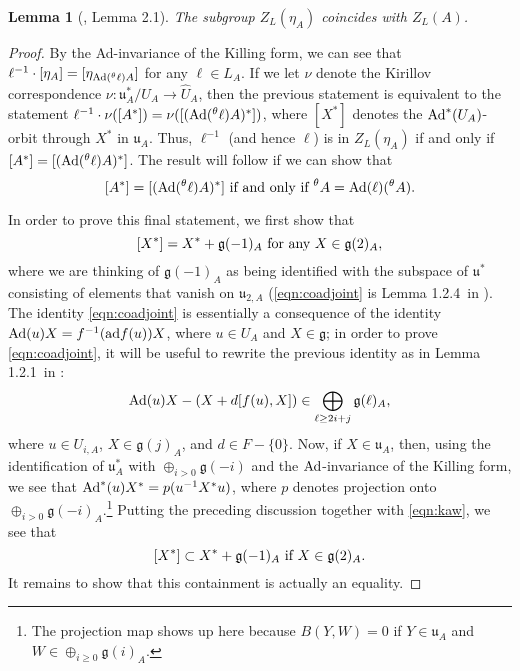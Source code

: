 \documentclass[11pt,letterpaper]{article}
\newcommand{\goth}{\mathfrak}
\newcommand{\Ad}{\textup{Ad}}
\newcommand{\ad}{\textup{ad}}
\newtheorem{Lemma}[Theorem]{Lemma}
\theoremstyle{remark}
\numberwithin{equation}{section}
\begin{document}
\begin{Lemma}[\cite{Yam}, Lemma 2.1]\label{stabilizer}
The subgroup $Z_L(\eta_A)$ coincides with $Z_L(A)$.
\end{Lemma}
\begin{proof}
By the Ad-invariance of the Killing form, we can see that $\ell^{-1} \cdot [\eta_A] = [\eta_{\Ad( ^{\theta}\ell)A}]$ for any $\ell \in L_A$. If we let $\nu$ denote the Kirillov correspondence $\nu: \goth{u}_A^{\ast}/U_A \to \widehat{U}_A$, then the previous statement is equivalent to the statement $\ell^{-1}\cdot \nu([A^{\ast}]) = \nu([(\Ad( ^{\theta}\ell)A)^{\ast}])$, where $[X^{\ast}]$ denotes the $\Ad^{\ast}(U_A)$-orbit through $X^{\ast}$ in $\goth{u}_A$. Thus, $\ell^{-1}$ (and hence $\ell$) is in $Z_L(\eta_A)$ if and only if $[A^{\ast}] = [(\Ad( ^{\theta}\ell)A)^{\ast}]$. The result will follow if we can show that \begin{equation} \label{eqn:orbit} [A^{\ast}] = [(\Ad( ^{\theta}\ell)A)^{\ast}] \textup{ if and only if } ^{\theta}A = \Ad(\ell) ({^{\theta}A}).\end{equation}

In order to prove this final statement, we first show that \begin{equation}\label{eqn:coadjoint} [X^{\ast}] = X^{\ast} + \goth{g}(-1)_A \textup{ for any } X \in \goth{g}(2)_A,\end{equation} where we are thinking of $\goth{g}(-1)_A$ as being identified with the subspace of $\goth{u}^{\ast}$ consisting of elements that vanish on $\goth{u}_{2,A}$ (\eqref{eqn:coadjoint} is Lemma 1.2.4~in \cite{Kaw2}). The identity \eqref{eqn:coadjoint} is essentially a consequence of the identity $\Ad(u)X = f^{-1}(\ad f(u))X$, where $u\in U_A$ and $X \in \mathfrak{g}$; in order to prove \eqref{eqn:coadjoint}, it will be useful to rewrite the previous identity as in Lemma 1.2.1~in \cite{Kaw2}: \begin{equation}\label{eqn:kaw} \Ad(u)X - (X+d[f(u),X]) \in \bigoplus_{\ell \geq 2i+j} \goth{g}(\ell)_A, \end{equation} where $u \in U_{i,A}$, $X \in \goth{g}(j)_A$, and $d \in F-\{0\}$. Now, if $X \in \goth{u}_A$, then, using the identification of $\goth{u}_A^{\ast}$ with $\oplus_{i>0} \goth{g}(-i)$ and the $\Ad$-invariance of the Killing form, we see that $\Ad^{\ast}(u)X^{\ast} = p(u^{-1}X^{\ast}u)$, where $p$ denotes projection onto $\oplus_{i>0} \goth{g}(-i)_A$.\footnote{The projection map shows up here because $B(Y,W) = 0$ if $Y \in \goth{u}_A$ and $W \in \oplus_{i\geq 0} \goth{g}(i)_A$.} Putting the preceding discussion together with \eqref{eqn:kaw}, we see that $$[X^{\ast}] \subset X^{\ast}+ \goth{g}(-1)_A \textup{ if } X \in \goth{g}(2)_A.$$ It remains to show that this containment is actually an equality.


\end{proof}
\end{document}
